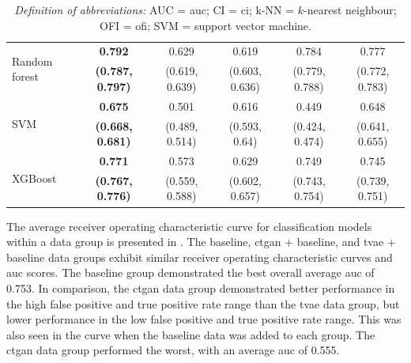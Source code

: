 \documentclass[12pt, a4paper]{article}
\begin{document}
\begin{table}
{\begin{tabular}{lccccc}
			\multirow{2}{*}{Random forest}       & \textbf{0.792}          & 0.629          & 0.619          & 0.784                     & 0.777                    \\
			                                     & \textbf{(0.787, 0.797)} & (0.619, 0.639) & (0.603, 0.636) & (0.779, 0.788)            & (0.772, 0.783)           \\[0.5em]
			\multirow{2}{*}{SVM}                 & \textbf{0.675}          & 0.501          & 0.616          & 0.449                     & 0.648                    \\
			                                     & \textbf{(0.668, 0.681)} & (0.489, 0.514) & (0.593, 0.64)  & (0.424, 0.474)            & (0.641, 0.655)           \\[0.5em]
			\multirow{2}{*}{XGBoost}             & \textbf{0.771}          & 0.573          & 0.629          & 0.749                     & 0.745                    \\
			                                     & \textbf{(0.767, 0.776)} & (0.559, 0.588) & (0.602, 0.657) & (0.743, 0.754)            & (0.739, 0.751)           \\
			\bottomrule
		\end{tabular}

	}
	\caption*{\small \textit{Definition of abbreviations:} AUC = \acrlong{auc}; CI = \acrlong{ci}; k-NN = $k$-nearest neighbour; OFI = \acrlong{ofi}; SVM = support vector machine.}
\end{table}

The average receiver operating characteristic curve for classification models within a data group is presented in
. The baseline, \acrshort{ctgan} + baseline, and \acrshort{tvae} + baseline data groups exhibit similar
receiver operating characteristic curves and \acrshort{auc} scores. The baseline group demonstrated the best overall
average \acrshort{auc} of 0.753. In comparison, the \acrshort{ctgan} data group demonstrated better performance in the
high false positive and true positive rate range than the \acrshort{tvae} data group, but lower performance in the low
false positive and true positive rate range. This was also seen in the curve when the baseline data was added to each
group. The \acrshort{ctgan} data group performed the worst, with an average \acrshort{auc} of 0.555.
\end{document}

